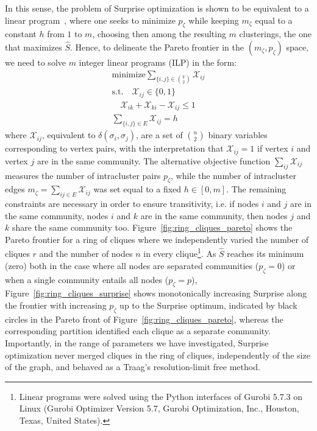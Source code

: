 In this sense, the problem of Surprise optimization is shown to be equivalent to a linear program~\cite{fleck2014}, where one seeks to minimize $p_\zeta$ while keeping $m_\zeta$ equal to a constant $h$ from $1$ to $m$, choosing then among the resulting $m$ clusterings, the one that maximizes $\hat{S}$.
Hence, to delineate the Pareto frontier in the $(m_\zeta,p_\zeta)$ space, we need to solve $m$ integer linear programs (ILP) in the form:
\begin{align}\label{eq:surprise_ilp}
\textrm{minimize} \sum_{\{i,j\} \in \binom{V}{2}} \mathcal{X}_{ij} \nonumber \\
\textrm{s.t.} \quad \mathcal{X}_{ij} \in \{0,1 \} \nonumber \\
\quad \mathcal{X}_{ik} + \mathcal{X}_{ki} - \mathcal{X}_{ij} \leq 1 \nonumber \\
\sum_{\{i,j\} \in E} \mathcal{X}_{ij}=h \nonumber
\end{align}
where $\mathcal{X}_{ij}$, equivalent to $\delta(\sigma_i, \sigma_j)$, are a set of $\binom{n}{2}$ binary variables corresponding to vertex pairs, with the interpretation that $\mathcal{X}_{ij}=1$ if vertex $i$ and vertex $j$ are in the same community. The alternative objective function $\sum_{ij}\mathcal{X}_{ij}$ measures the number of intracluster pairs $p_\zeta$, while the number of intracluster edges $m_\zeta=\sum_{ij \in E} \mathcal{X}_{ij}$ was set equal to a fixed $h \in [0,m]$. The remaining constraints are necessary in order to ensure transitivity, i.e. if nodes $i$ and $j$ are in the same community, nodes $i$ and $k$ are in the same community, then nodes $j$ and $k$ share the same community too. 
Figure~\ref{fig:ring_cliques_pareto} shows the Pareto frontier for a ring of cliques where we independently varied the number of cliques $r$ and the number of nodes $n$ in every clique\footnote{Linear programs were solved using the Python interfaces of Gurobi 5.7.3 on Linux (Gurobi Optimizer Version 5.7, Gurobi Optimization, Inc., Houston, Texas, United States).}.
As $\hat{S}$ reaches its minimum (zero) both in the case where all nodes are separated communities ($p_\zeta=0$) or when a single community entails all nodes ($p_\zeta=p$), Figure~\ref{fig:ring_cliques_surprise} shows monotonically increasing Surprise along the frontier with increasing $p_\zeta$ up to the Surprise optimum, indicated by black circles in the Pareto front of Figure~\ref{fig:ring_cliques_pareto}, whereas the corresponding partition identified each clique as a separate community.
Importantly, in the range of parameters we have investigated, Surprise optimization never merged cliques in the ring of cliques, independently of the size of the graph, and behaved as a Traag's resolution-limit free method.

